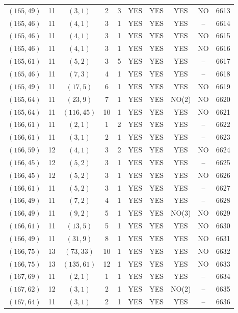 \begin{longtable}{|c|c|c|c|c|c|c|c|c|c|}
$(165, 49)$ & 11 & $(3, 1)$ & 2 & 3 & YES & YES & YES & NO & 6613\\
$(165, 46)$ & 11 & $(4, 1)$ & 3 & 1 & YES & YES & YES & -- & 6614\\
$(165, 46)$ & 11 & $(4, 1)$ & 3 & 1 & YES & YES & YES & NO & 6615\\
$(165, 46)$ & 11 & $(4, 1)$ & 3 & 1 & YES & YES & YES & NO & 6616\\
$(165, 61)$ & 11 & $(5, 2)$ & 3 & 5 & YES & YES & YES & -- & 6617\\
$(165, 46)$ & 11 & $(7, 3)$ & 4 & 1 & YES & YES & YES & -- & 6618\\
$(165, 49)$ & 11 & $(17, 5)$ & 6 & 1 & YES & YES & YES & NO & 6619\\
$(165, 64)$ & 11 & $(23, 9)$ & 7 & 1 & YES & YES & NO(2) & NO & 6620\\
$(165, 64)$ & 11 & $(116, 45)$ & 10 & 1 & YES & YES & YES & NO & 6621\\
$(166, 61)$ & 11 & $(2, 1)$ & 1 & 2 & YES & YES & YES & -- & 6622\\
$(166, 61)$ & 11 & $(3, 1)$ & 2 & 1 & YES & YES & YES & -- & 6623\\
$(166, 59)$ & 12 & $(4, 1)$ & 3 & 2 & YES & YES & YES & NO & 6624\\
$(166, 45)$ & 12 & $(5, 2)$ & 3 & 1 & YES & YES & YES & -- & 6625\\
$(166, 45)$ & 12 & $(5, 2)$ & 3 & 1 & YES & YES & YES & NO & 6626\\
$(166, 61)$ & 11 & $(5, 2)$ & 3 & 1 & YES & YES & YES & -- & 6627\\
$(166, 49)$ & 11 & $(7, 2)$ & 4 & 1 & YES & YES & YES & -- & 6628\\
$(166, 49)$ & 11 & $(9, 2)$ & 5 & 1 & YES & YES & NO(3) & NO & 6629\\
$(166, 61)$ & 11 & $(13, 5)$ & 5 & 1 & YES & YES & YES & NO & 6630\\
$(166, 49)$ & 11 & $(31, 9)$ & 8 & 1 & YES & YES & YES & NO & 6631\\
$(166, 75)$ & 13 & $(73, 33)$ & 10 & 1 & YES & YES & YES & NO & 6632\\
$(166, 75)$ & 13 & $(135, 61)$ & 12 & 1 & YES & YES & YES & NO & 6633\\
$(167, 69)$ & 11 & $(2, 1)$ & 1 & 1 & YES & YES & YES & -- & 6634\\
$(167, 62)$ & 12 & $(3, 1)$ & 2 & 1 & YES & YES & NO(2) & -- & 6635\\
$(167, 64)$ & 11 & $(3, 1)$ & 2 & 1 & YES & YES & YES & -- & 6636\\

\end{longtable}
